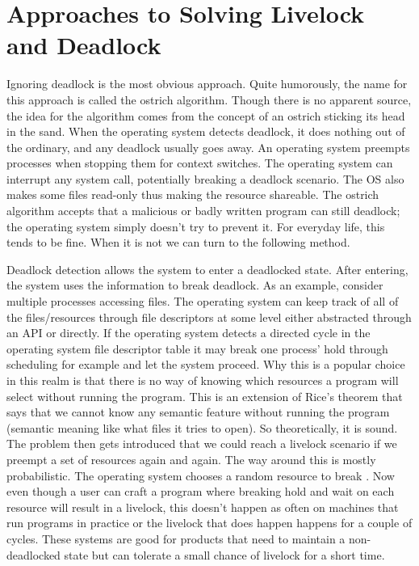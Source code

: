 \section{Approaches to Solving Livelock and Deadlock}

Ignoring deadlock is the most obvious approach.
Quite humorously, the name for this approach is called the ostrich algorithm.
Though there is no apparent source, the idea for the algorithm comes from the concept of an ostrich sticking its head in the sand.
When the operating system detects deadlock, it does nothing out of the ordinary, and any deadlock usually goes away.
An operating system preempts processes when stopping them for context switches.
The operating system can interrupt any system call, potentially breaking a deadlock scenario.
The OS also makes some files read-only thus making the resource shareable.
The ostrich algorithm accepts that a malicious or badly written program can still deadlock; the operating system simply doesn't try to prevent it.
For everyday life, this tends to be fine.
When it is not we can turn to the following method.

Deadlock detection allows the system to enter a deadlocked state.
After entering, the system uses the information to break deadlock.
As an example, consider multiple processes accessing files.
The operating system can keep track of all of the files/resources through file descriptors at some level either abstracted through an API or directly.
If the operating system detects a directed cycle in the operating system file descriptor table it may break one process' hold through scheduling for example and let the system proceed.
Why this is a popular choice in this realm is that there is no way of knowing which resources a program will select without running the program.
This is an extension of Rice's theorem \cite{rice} that says that we cannot know any semantic feature without running the program (semantic meaning like what files it tries to open).
So theoretically, it is sound.
The problem then gets introduced that we could reach a livelock scenario if we preempt a set of resources again and again.
The way around this is mostly probabilistic.
The operating system chooses a random resource to break .
Now even though a user can craft a program where breaking hold and wait on each resource will result in a livelock, this doesn't happen as often on machines that run programs in practice or the livelock that does happen happens for a couple of cycles.
These systems are good for products that need to maintain a non-deadlocked state but can tolerate a small chance of livelock for a short time.

